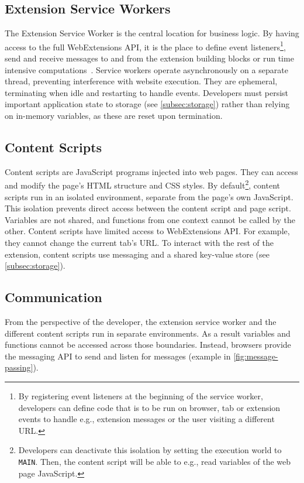 \subsection{Extension Service Workers} \label{subsec:service-workers}
The Extension Service Worker is the central location for business logic.
By having access to the full WebExtensions API, it is the place to define event listeners\footnote{
By registering event listeners at the beginning of the service worker, developers can define code that is to be run on browser, tab or extension events to handle e.g., extension messages or the user visiting a different URL.},
send and receive messages to and from the extension building blocks 
or run time intensive computations~\cite[Ch. 4]{frisbie2023browser}.
Service workers operate asynchronously on a separate thread, preventing interference with website execution. 
They are ephemeral, terminating when idle and restarting to handle events. Developers must persist important application state to storage (see \cref{subsec:storage}) rather than relying on in-memory variables, as these are reset upon termination.

\subsection{Content Scripts} \label{subsec:content-scripts}
Content scripts are JavaScript programs injected into web pages. 
They can access and modify the page's HTML structure and CSS styles.
By default\footnote{
Developers can deactivate this isolation by setting the execution world to \texttt{MAIN}. Then, the content script will be able to e.g., read variables of the web page JavaScript.
}, content scripts run in an isolated environment, separate from the page's own JavaScript.
This isolation prevents direct access between the content script and page script.
Variables are not shared, and functions from one context cannot be called by the other.
Content scripts have limited access to WebExtensions API. 
For example, they cannot change the current tab's URL.
To interact with the rest of the extension, content scripts use messaging and a shared key-value store (see \cref{subsec:storage}).

\subsection{Communication}
From the perspective of the developer, the extension service worker and the different content scripts run in separate environments. 
As a result variables and functions cannot be accessed across those boundaries.
Instead, browsers provide the messaging API to send and listen for messages (example in \cref{fig:message-passing}).


